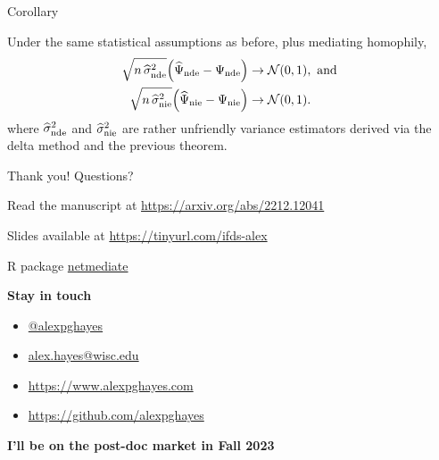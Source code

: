 \documentclass{beamer}
\theoremstyle{remark}
\begin{document}
\begin{frame}{Corollary}

    \begin{theorem}

        \vspace{2mm}

        Under the same statistical assumptions as before, plus mediating homophily,
        \begin{align*}
            \sqrt{n \, \sigmahatnde} \paren*{\ndehat - \nde}
             & \to
            \Normal{0}{1}, \text { and } \\
            \sqrt{n \, \sigmahatnie} \paren*{\niehat - \nie}
             & \to
            \Normal{0}{1}.
        \end{align*}
        \noindent where $\widehat{\sigma}^2_\mathrm{nde}$ and $\widehat{\sigma}^2_\mathrm{nie}$ are rather unfriendly variance estimators derived via the delta method and the previous theorem.

    \end{theorem}

\end{frame}






\begin{frame}{Thank you! Questions?}

    Read the manuscript at \url{https://arxiv.org/abs/2212.12041}

    Slides available at \url{https://tinyurl.com/ifds-alex}

    R package \href{https://github.com/alexpghayes/netmediate}{netmediate}

    \textbf{Stay in touch}

    \begin{itemize}
        \item[]  \href{https://twitter.com/alexpghayes}{@alexpghayes}
        \item[]  \href{mailto:alex.hayes@wisc.edu}{alex.hayes@wisc.edu}
        \item[]  \url{https://www.alexpghayes.com} %
        \item[]  \url{https://github.com/alexpghayes}
    \end{itemize}

    \textbf{I'll be on the post-doc market in Fall 2023}
\end{frame}
\end{document}
